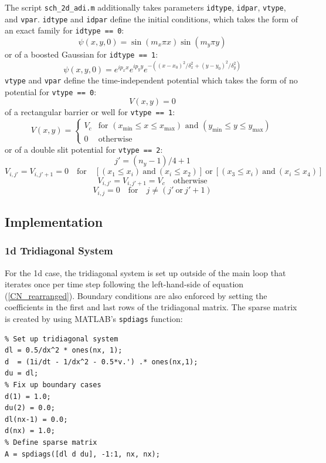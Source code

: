 \documentclass[10pt]{article}
\def\code#1{\texttt{#1}} %
\begin{document}
The script \code{sch\_2d\_adi.m} additionally takes parameters \code{idtype}, \code{idpar}, 
\code{vtype}, and \code{vpar}. \code{idtype} and \code{idpar} define the initial conditions, 
which takes the form of an exact family for \code{idtype == 0}:
$$\psi(x,y,0) = \sin(m_x \pi x) \sin(m_y \pi y)$$
or of a boosted Gaussian for \code{idtype == 1}: 
$$\psi(x,y,0) = e^{i p_x x} e^{i p_y y} e^{-((x - x_0)^2 / \delta_x^2 + (y - y_0)^2 / \delta_y^2)}$$
\code{vtype} and \code{vpar} define the time-independent potential which takes the form of no 
potential for \code{vtype == 0}:
$$V(x,y) = 0$$
of a rectangular barrier or well for \code{vtype == 1}:
$$V(x, y) = 
\begin{cases} 
V_c & \text{for } (x_{\min} \leq x \leq x_{\max}) \text{ and } (y_{\min} \leq y \leq y_{\max}) \\
0 & \text{otherwise}
\end{cases}$$
or of a double slit potential for \code{vtype == 2}:
$$j' = (n_y - 1) / 4 + 1$$
$$V_{i,j'} = V_{i,j'+1} = 0 \quad \text{for} \quad 
\left[ (x_1 \leq x_i) \ \text{and} \ (x_i \leq x_2) \right] \ \text{or} \ 
\left[ (x_3 \leq x_i) \ \text{and} \ (x_i \leq x_4) \right]$$
$$V_{i,j'} = V_{i,j'+1} = V_c \quad \text{otherwise}$$
$$V_{i,j} = 0 \quad \text{for} \quad j \neq (j' \ \text{or} \ j'+1)$$

\subsection*{Implementation}

\subsubsection*{1d Tridiagonal System}

For the 1d case, the tridiagonal system is set up outside of the main loop that iterates once per time
step following the left-hand-side of equation (\ref{CN_rearranged}). Boundary conditions are also 
enforced by setting the coefficients in the first and last rows of the tridiagonal matrix. The sparse
matrix is created by using MATLAB's \code{spdiags} function:
\begin{verbatim}
% Set up tridiagonal system
dl = 0.5/dx^2 * ones(nx, 1);
d  = (1i/dt - 1/dx^2 - 0.5*v.') .* ones(nx,1);
du = dl;
% Fix up boundary cases
d(1) = 1.0;
du(2) = 0.0;
dl(nx-1) = 0.0;
d(nx) = 1.0;
% Define sparse matrix
A = spdiags([dl d du], -1:1, nx, nx);
\end{verbatim}
\end{document}
